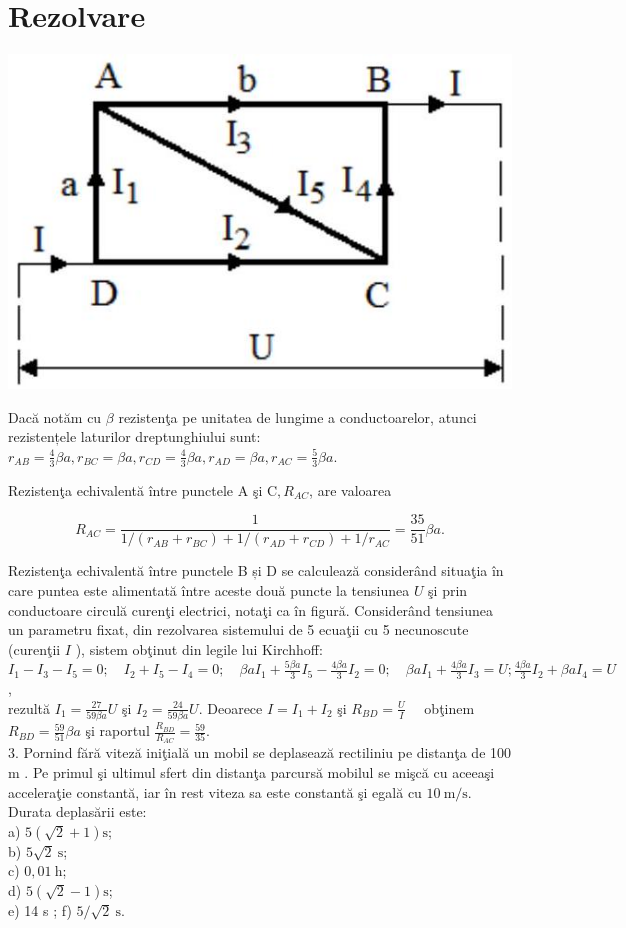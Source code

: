 \section*{Rezolvare}
\begin{center}
\includegraphics[width=0.4\linewidth]{images/2025_08_19_9e83650bd9c853eca85eg-12}
\end{center}

Dacă notăm cu $\beta$ rezistenţa pe unitatea de lungime a conductoarelor, atunci rezistențele laturilor dreptunghiului sunt: $r_{A B}=\frac{4}{3} \beta a, r_{B C}=\beta a, r_{C D}=\frac{4}{3} \beta a, r_{A D}=\beta a, r_{A C}=\frac{5}{3} \beta a$.

Rezistenţa echivalentă între punctele A şi $\mathrm{C}, R_{A C}$, are valoarea

$$
R_{A C}=\frac{1}{1 /\left(r_{A B}+r_{B C}\right)+1 /\left(r_{A D}+r_{C D}\right)+1 / r_{A C}}=\frac{35}{51} \beta a .
$$

Rezistenţa echivalentă între punctele B și D se calculează considerând situaţia în care puntea este alimentată între aceste două puncte la tensiunea $U$ şi prin conductoare circulă curenţi electrici, notaţi ca în figură. Considerând tensiunea un parametru fixat, din rezolvarea sistemului de 5 ecuaţii cu 5 necunoscute (curenţii $I$ ), sistem obţinut din legile lui Kirchhoff:\\
$I_{1}-I_{3}-I_{5}=0 ; \quad I_{2}+I_{5}-I_{4}=0 ; \quad \beta a I_{1}+\frac{5 \beta a}{3} I_{5}-\frac{4 \beta a}{3} I_{2}=0 ; \quad \beta a I_{1}+\frac{4 \beta a}{3} I_{3}=U ; \frac{4 \beta a}{3} I_{2}+\beta a I_{4}=U$,\\
rezultă $I_{1}=\frac{27}{59 \beta a} U$ şi $I_{2}=\frac{24}{59 \beta a} U$. Deoarece $I=I_{1}+I_{2}$ şi $R_{B D}=\frac{U}{I} \quad$ obţinem $R_{B D}=\frac{59}{51} \beta a$ şi raportul $\frac{R_{B D}}{R_{A C}}=\frac{59}{35}$.\\
3. Pornind fără viteză iniţială un mobil se deplasează rectiliniu pe distanţa de 100 m . Pe primul şi ultimul sfert din distanţa parcursă mobilul se mişcă cu aceeaşi acceleraţie constantă, iar în rest viteza sa este constantă şi egală cu $10 \mathrm{~m} / \mathrm{s}$. Durata deplasării este:\\
a) $5(\sqrt{2}+1) \mathrm{s}$;\\
b) $5 \sqrt{2} \mathrm{~s}$;\\
c) $0,01 \mathrm{~h}$;\\
d) $5(\sqrt{2}-1) \mathrm{s}$;\\
e) 14 s ; f) $5 / \sqrt{2} \mathrm{~s}$.

